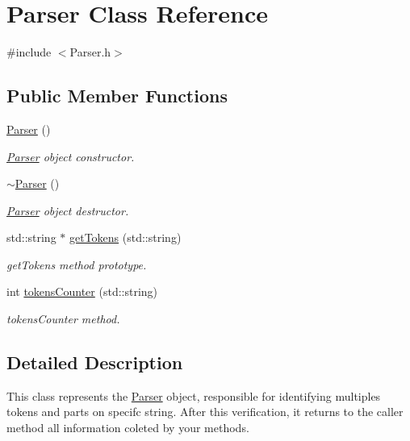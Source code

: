 \hypertarget{classParser}{}\section{Parser Class Reference}
\label{classParser}


{\ttfamily \#include $<$Parser.\+h$>$}

\subsection*{Public Member Functions}
\begin{DoxyCompactItemize}
\item 
\mbox{\label{classParser_a12234f6cd36b61af4b50c94a179422c1}} 
\hyperlink{classParser_a12234f6cd36b61af4b50c94a179422c1}{Parser} ()
\begin{DoxyCompactList}\small\item\em \hyperlink{classParser}{Parser} object constructor. \end{DoxyCompactList}\item 
\mbox{\label{classParser_a3e658b5917a93a3ef648050d060e3a93}} 
\hyperlink{classParser_a3e658b5917a93a3ef648050d060e3a93}{$\sim$\+Parser} ()
\begin{DoxyCompactList}\small\item\em \hyperlink{classParser}{Parser} object destructor. \end{DoxyCompactList}\item 
std\+::string $\ast$ \hyperlink{classParser_a0182d00abdc54e826dd081b4a0246c3c}{get\+Tokens} (std\+::string)
\begin{DoxyCompactList}\small\item\em get\+Tokens method prototype. \end{DoxyCompactList}\item 
int \hyperlink{classParser_a985b182e8f0852e2b68999f7266753d9}{tokens\+Counter} (std\+::string)
\begin{DoxyCompactList}\small\item\em tokens\+Counter method. \end{DoxyCompactList}\end{DoxyCompactItemize}


\subsection{Detailed Description}
This class represents the \hyperlink{classParser}{Parser} object, responsible for identifying multiples tokens and parts on specifc string. After this verification, it returns to the caller method all information coleted by your methods. 

